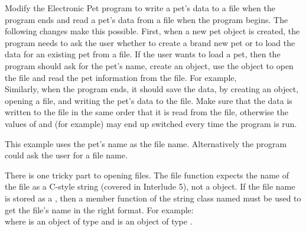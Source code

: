 
Modify the Electronic Pet program to write a pet's data to a file when the program ends and read a pet's data from a file when the program begins.  
The following changes make this possible.  First, when a new pet object is created, the program needs to ask the user whether to create a brand new pet or to load the data for an existing pet from a file.  If the user wants to load a pet, then the program should ask for the pet's name, create an  object,  use the  object to open the file and read the pet information from the file.  For example,\\
Similarly, when the program ends, it should save the data, by creating an  object, opening a file, and writing the pet's data to the file.  Make sure that the data is written to the file in the same order that it is read from the file, otherwise the values of  and  (for example) may end up switched every time the program is run.

This example uses the pet's name as the file name.  Alternatively the program could ask the user for a file name.

There is one tricky part to opening files.  The file  function expects the name of the file as a C-style string (covered in Interlude 5), not a  object. If the file name is stored as a , then a member function of the string class named  must be used to get the file's name in the right format.  For example:\\
where  is an object of type  and  is an object of type .

